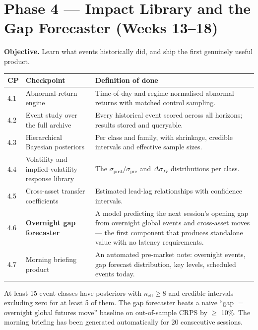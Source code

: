 \section{Phase 4 --- Impact Library and the Gap Forecaster (Weeks 13--18)}

\textbf{Objective.} Learn what events historically did, and ship the first
genuinely useful product.

\begin{longtable}{@{}p{1.4cm}p{6.0cm}p{7.0cm}@{}}
\toprule
\textbf{CP} & \textbf{Checkpoint} & \textbf{Definition of done}\\
\midrule
4.1 & Abnormal-return engine & Time-of-day and regime normalised abnormal
returns with matched control sampling.\\
4.2 & Event study over the full archive & Every historical event scored across
all horizons; results stored and queryable.\\
4.3 & Hierarchical Bayesian posteriors & Per class and family, with shrinkage,
credible intervals and effective sample sizes.\\
4.4 & Volatility and implied-volatility response library & The
$\sigma_{\text{post}}/\sigma_{\text{pre}}$ and $\Delta\sigma_{IV}$ distributions
per class.\\
4.5 & Cross-asset transfer coefficients & Estimated lead-lag relationships with
confidence intervals.\\
4.6 & \textbf{Overnight gap forecaster} & A model predicting the next session's
opening gap from overnight global events and cross-asset moves --- the first
component that produces standalone value with no latency requirements.\\
4.7 & Morning briefing product & An automated pre-market note: overnight events,
gap forecast distribution, key levels, scheduled events today.\\
\bottomrule
\end{longtable}

\begin{gatebox}[title={Gate G4}]
At least 15 event classes have posteriors with $n_{\text{eff}} \ge 8$ and
credible intervals excluding zero for at least 5 of them. The gap forecaster
beats a naive ``gap $=$ overnight global futures move'' baseline on out-of-sample
CRPS by $\ge$ 10\%. The morning briefing has been generated automatically for 20
consecutive sessions.
\end{gatebox}

